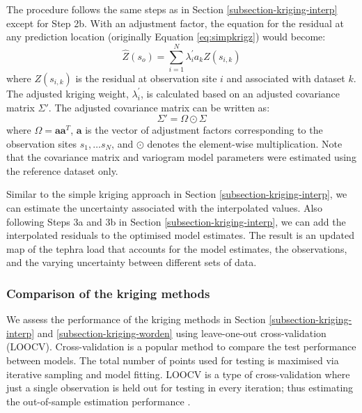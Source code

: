     The procedure follows the same steps as in Section \ref{subsection-kriging-interp} except for Step 2b. With an adjustment factor, the equation for the residual at any prediction location (originally Equation \ref{eq:simpkrigz}) would become:
        \begin{equation} \label{eq:simpkrig-z2}
        \hat{Z}(s_{o}) = \sum_{i=1}^{N} \lambda^{'}_{i} a_{k} Z(s_{i,k})
        \end{equation} 
    where $Z(s_{i,k})$ is the residual at observation site $i$ and associated with dataset $k$. The adjusted kriging weight, $\lambda^{'}_{i}$, is calculated based on an adjusted covariance matrix $\Sigma'$. The adjusted covariance matrix can be written as:
        \begin{equation} \label{eq:covadjust}
        \Sigma' = \Omega \odot \Sigma
        \end{equation} 
    where $\Omega = \mathbf{a}\mathbf{a}^{T}$, $\mathbf{a}$ is the vector of adjustment factors corresponding to the observation sites ${s}_{1}, \dots {s}_{N}$, and $\odot$ denotes the element-wise multiplication. Note that the covariance matrix and variogram model parameters were estimated using the reference dataset only. 
  
    Similar to the simple kriging approach in Section \ref{subsection-kriging-interp}, we can estimate the uncertainty associated with the interpolated values. Also following Steps 3a and 3b in Section \ref{subsection-kriging-interp}, we can add the interpolated residuals to the optimised model estimates. The result is an updated map of the tephra load that accounts for the model estimates, the observations, and the varying uncertainty between different sets of data.

\subsubsection{Comparison of the kriging methods}
  
    We assess the performance of the kriging methods in Section \ref{subsection-kriging-interp} and \ref{subsection-kriging-worden} using leave-one-out cross-validation (LOOCV). Cross-validation is a popular method to compare the test performance between models. The total number of points used for testing is maximised via iterative sampling and model fitting. LOOCV is a type of cross-validation where just a single observation is held out for testing in every iteration; thus estimating the out-of-sample estimation performance \citep{shao1993linear}. 
    

